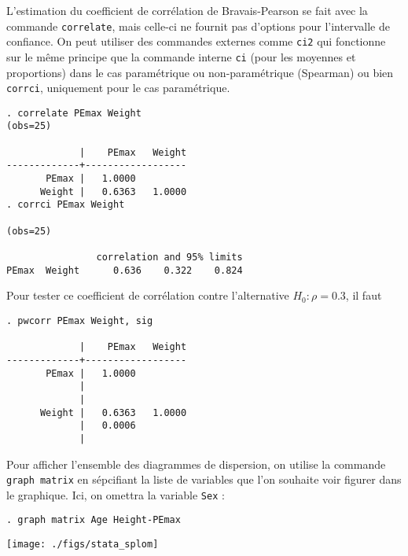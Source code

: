 L'estimation du coefficient de corrélation de Bravais-Pearson se fait avec
la commande \texttt{correlate}, mais celle-ci ne fournit pas d'options pour
l'intervalle de confiance. On peut utiliser des commandes externes comme
\texttt{ci2} qui fonctionne sur le même principe que la commande interne
\texttt{ci} (pour les moyennes et proportions) dans le cas paramétrique ou
non-paramétrique (Spearman) ou bien \texttt{corrci}, uniquement pour le cas
paramétrique. \label{cmd:corrci}
\begin{verbatim}
. correlate PEmax Weight
(obs=25)

             |    PEmax   Weight
-------------+------------------
       PEmax |   1.0000
      Weight |   0.6363   1.0000
. corrci PEmax Weight

(obs=25)

                correlation and 95% limits
PEmax  Weight      0.636    0.322    0.824
\end{verbatim}

Pour tester ce coefficient de corrélation contre l'alternative $H_0:
\rho=0.3$, il faut
\begin{verbatim}
. pwcorr PEmax Weight, sig

             |    PEmax   Weight
-------------+------------------
       PEmax |   1.0000 
             |
             |
      Weight |   0.6363   1.0000 
             |   0.0006
             |
\end{verbatim}

Pour afficher l'ensemble des diagrammes de dispersion, on utilise la
commande \texttt{graph matrix} en sépcifiant la liste de variables que l'on
souhaite voir figurer dans le graphique. Ici, on omettra la variable
\texttt{Sex} : 
\begin{verbatim}
. graph matrix Age Height-PEmax
\end{verbatim}

\texttt{[image: ./figs/stata\_splom]}


